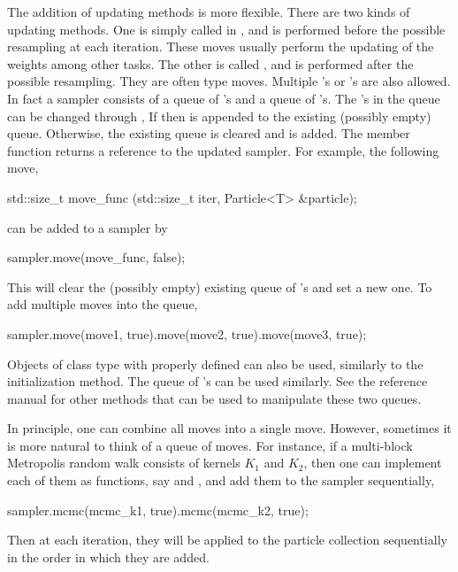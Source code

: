 The addition of updating methods is more flexible. There are two kinds of
updating methods. One is simply called  in \vsmc, and is
performed before the possible resampling at each iteration. These moves
usually perform the updating of the weights among other tasks. The other is
called , and is performed after the possible resampling. They
are often \mcmc type moves. Multiple 's or 's
are also allowed. In fact a \vsmc sampler consists of a queue of
's and a queue of 's. The 's
in the queue can be changed through ,
If  then  is appended to the
existing (possibly empty) queue. Otherwise, the existing queue is cleared and
 is added. The member function returns a reference to the
updated sampler. For example, the following move,
\begin{cppcode}
std::size_t move_func (std::size_t iter, Particle<T> &particle);
\end{cppcode}
can be added to a sampler by
\begin{cppcode}
sampler.move(move_func, false);
\end{cppcode}
This will clear the (possibly empty) existing queue of 's and
set a new one. To add multiple moves into the queue,
\begin{cppcode}
sampler.move(move1, true).move(move2, true).move(move3, true);
\end{cppcode}
Objects of class type with  properly defined can also be
used, similarly to the initialization method. The queue of 's
can be used similarly. See the reference manual for other methods that can be
used to manipulate these two queues.

In principle, one can combine all moves into a single move. However, sometimes
it is more natural to think of a queue of moves. For instance, if a
multi-block Metropolis random walk consists of kernels $K_1$ and $K_2$, then
one can implement each of them as functions, say  and
, and add them to the sampler sequentially,
\begin{cppcode}
sampler.mcmc(mcmc_k1, true).mcmc(mcmc_k2, true);
\end{cppcode}
Then at each iteration, they will be applied to the particle collection
sequentially in the order in which they are added.

